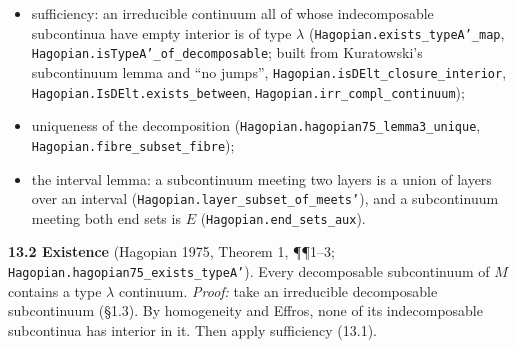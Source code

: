 \documentclass[11pt]{article}
\newcommand{\lean}[1]{\texttt{#1}}
\begin{document}
\begin{itemize}
  \item sufficiency: an irreducible continuum all of whose indecomposable subcontinua have empty interior is of type $\lambda$ (\lean{Hagopian.\hspace{0pt}exists\_\hspace{0pt}typeA'\_\hspace{0pt}map}, \lean{Hagopian.\hspace{0pt}isTypeA'\_\hspace{0pt}of\_\hspace{0pt}decomposable}; built from Kuratowski's subcontinuum lemma and ``no jumps'', \lean{Hagopian.\hspace{0pt}isDElt\_\hspace{0pt}closure\_\hspace{0pt}interior}, \lean{Hagopian.\hspace{0pt}IsDElt.\hspace{0pt}exists\_\hspace{0pt}between}, \lean{Hagopian.\hspace{0pt}irr\_\hspace{0pt}compl\_\hspace{0pt}continuum});
  \item uniqueness of the decomposition (\lean{Hagopian.\hspace{0pt}hagopian75\_\hspace{0pt}lemma3\_\hspace{0pt}unique}, \lean{Hagopian.\hspace{0pt}fibre\_\hspace{0pt}subset\_\hspace{0pt}fibre});
  \item the interval lemma: a subcontinuum meeting two layers is a union of layers over an interval (\lean{Hagopian.\hspace{0pt}layer\_\hspace{0pt}subset\_\hspace{0pt}of\_\hspace{0pt}meets'}), and a subcontinuum meeting both end sets is $E$ (\lean{Hagopian.\hspace{0pt}end\_\hspace{0pt}sets\_\hspace{0pt}aux}).
\end{itemize}

\textbf{13.2 Existence} (Hagopian 1975, Theorem 1, \P{}\P{}1--3; \lean{Hagopian.\hspace{0pt}hagopian75\_\hspace{0pt}exists\_\hspace{0pt}typeA'}). Every decomposable subcontinuum of $M$ contains a type $\lambda$ continuum. \emph{Proof:} take an irreducible decomposable subcontinuum (\S{}1.3). By homogeneity and Effros, none of its indecomposable subcontinua has interior in it. Then apply sufficiency (13.1).
\end{document}
